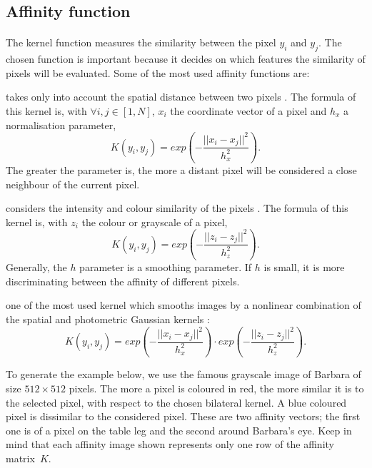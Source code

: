 \subsection{Affinity function}
\label{variations:affinity_functions}

\paragraph{}
The kernel function measures the similarity between the pixel \(y_i\) and \(y_j\).
The chosen function is important because it decides on which features the similarity of pixels will be evaluated.
Some of the most used affinity functions are:

\begin{description}[align=left]
 \item [Spatial Gaussian kernel] takes only into account the spatial distance between two pixels \cite{siam_slides_2016}.
  The formula of this kernel is, with \(\forall i, j \in [1, N]\), \(x_i\) the coordinate vector of a pixel and \(h_x\) a normalisation parameter,
  \[K(y_i, y_j) = exp(-\frac{||x_i - x_j||^2}{h_x^2}).\]
  The greater the parameter is, the more a distant pixel will be considered a close neighbour of the current pixel.

 \item [Photometric Gaussian kernel] considers the intensity and colour similarity of the pixels \cite{siam_slides_2016}.
  The formula of this kernel is, with \(z_i\) the colour or grayscale of a pixel,
  \[K(y_i, y_j) = exp(-\frac{||z_i - z_j||^2}{h_z^2}).\]
  Generally, the \(h\) parameter is a smoothing parameter.
  If \(h\) is small, it is more discriminating between the affinity of different pixels.

 \item [Bilateral kernel] one of the most used kernel which smooths images by a nonlinear combination of the spatial and photometric Gaussian kernels \cite{siam_slides_2016} \cite{glide_2014} \cite{bilateral_tomasi_1998}:
  \[K(y_i, y_j) = exp(-\frac{||x_i - x_j||^2}{h_x^2}) \cdot exp(-\frac{||z_i - z_j||^2}{h_z^2}).\]

  To generate the example below, we use the famous grayscale image of Barbara of size \(512 \times 512\) pixels.
  The more a pixel is coloured in red, the more similar it is to the selected pixel, with respect to the chosen bilateral kernel.
  A blue coloured pixel is dissimilar to the considered pixel.
  These are two affinity vectors; the first one is of a pixel on the table leg and the second around Barbara's eye.
  Keep in mind that each affinity image shown represents only one row of the affinity matrix\ \(K\).


\end{description}
